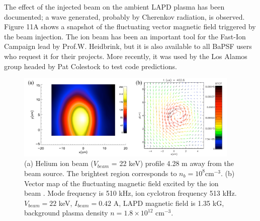 \documentclass[11pt]{article}
\begin{document}
The effect of the injected beam on the ambient LAPD plasma has been documented; a wave generated, probably by Cherenkov radiation, is observed. Figure 11A shows a snapshot of the fluctuating vector magnetic field triggered by the beam injection.  The ion beam has been an important tool for the Fast-Ion Campaign lead by Prof.W. Heidbrink, but it is also available to all BaPSF users who request it for their projects.   More recently, it was used by the Los Alamos group headed by Pat Colestock to test code predictions.
\begin{figure}[htbp] %
   \centering
   \includegraphics[width=0.95\textwidth]{ionbeam_and_wave.jpg} 
   \caption{(a) Helium ion beam ($V_{beam}$ = 22 keV) profile 4.28 m away from the beam source.  The brightest region corresponds to $n_{b} = 10^{8} $cm$^{-3}$. (b) Vector map of the fluctuating magnetic field excited by the ion beam .  Mode frequency is 510 kHz, ion cyclotron frequency 513 kHz.  $V_{beam} = 22$ keV, $I_{beam} = 0.42$ A, LAPD magnetic field is 1.35 kG, background plasma density $n = 1.8 \times 10^{12}$ cm$^{-3}$. }
   \label{fig:ionbeam_and_wave}
\end{figure}
 
\end{document}
